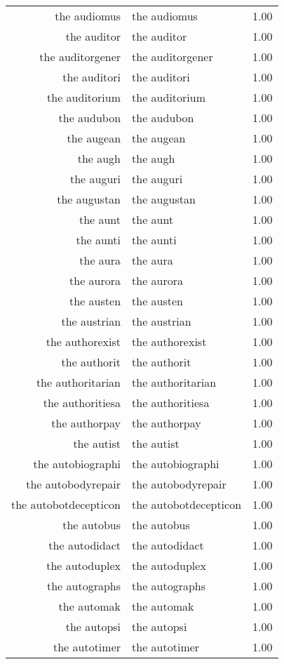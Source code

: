 \begin{table}[ht]
\begin{tabular}{rlr}
  the audiomus & the audiomus & 1.00 \\ 
  the auditor & the auditor & 1.00 \\ 
  the auditorgener & the auditorgener & 1.00 \\ 
  the auditori & the auditori & 1.00 \\ 
  the auditorium & the auditorium & 1.00 \\ 
  the audubon & the audubon & 1.00 \\ 
  the augean & the augean & 1.00 \\ 
  the augh & the augh & 1.00 \\ 
  the auguri & the auguri & 1.00 \\ 
  the augustan & the augustan & 1.00 \\ 
  the aunt & the aunt & 1.00 \\ 
  the aunti & the aunti & 1.00 \\ 
  the aura & the aura & 1.00 \\ 
  the aurora & the aurora & 1.00 \\ 
  the austen & the austen & 1.00 \\ 
  the austrian & the austrian & 1.00 \\ 
  the authorexist & the authorexist & 1.00 \\ 
  the authorit & the authorit & 1.00 \\ 
  the authoritarian & the authoritarian & 1.00 \\ 
  the authoritiesa & the authoritiesa & 1.00 \\ 
  the authorpay & the authorpay & 1.00 \\ 
  the autist & the autist & 1.00 \\ 
  the autobiographi & the autobiographi & 1.00 \\ 
  the autobodyrepair & the autobodyrepair & 1.00 \\ 
  the autobotdecepticon & the autobotdecepticon & 1.00 \\ 
  the autobus & the autobus & 1.00 \\ 
  the autodidact & the autodidact & 1.00 \\ 
  the autoduplex & the autoduplex & 1.00 \\ 
  the autographs & the autographs & 1.00 \\ 
  the automak & the automak & 1.00 \\ 
  the autopsi & the autopsi & 1.00 \\ 
  the autotimer & the autotimer & 1.00 \\ 

\end{tabular}
\end{table}
